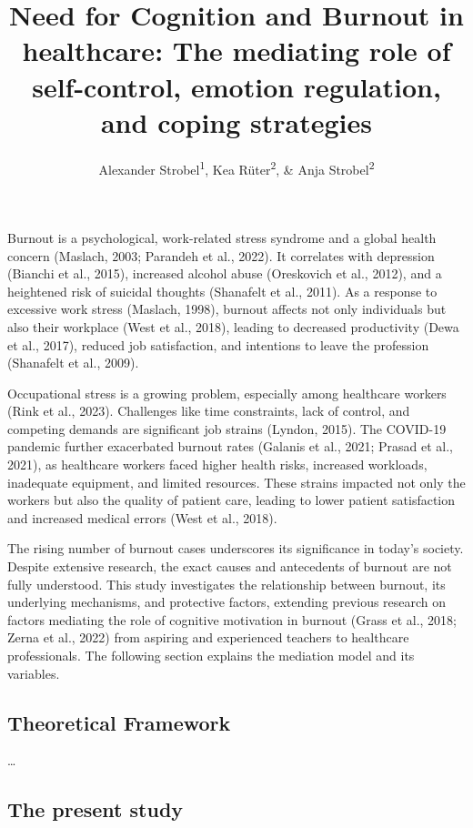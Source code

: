 \documentclass[
  man]{apa6}
\title{Need for Cognition and Burnout in healthcare: The mediating role of self-control, emotion regulation, and coping strategies}
\author{Alexander Strobel\textsuperscript{1}, Kea Rüter\textsuperscript{2}, \& Anja Strobel\textsuperscript{2}}
\date{}
\affiliation{\vspace{0.5cm}\textsuperscript{1} Faculty of Psychology, Technische Universität Dresden, Dresden, Germany\\\textsuperscript{2} Department of Psychology, Technische Universität Chemnitz, Chemnitz, Germany}
\begin{document}
\maketitle

Burnout is a psychological, work-related stress syndrome and a global health concern (Maslach, 2003; Parandeh et al., 2022).
It correlates with depression (Bianchi et al., 2015), increased alcohol abuse (Oreskovich et al., 2012), and a heightened risk of suicidal thoughts (Shanafelt et al., 2011).
As a response to excessive work stress (Maslach, 1998), burnout affects not only individuals but also their workplace (West et al., 2018), leading to decreased productivity (Dewa et al., 2017), reduced job satisfaction, and intentions to leave the profession (Shanafelt et al., 2009).

Occupational stress is a growing problem, especially among healthcare workers (Rink et al., 2023).
Challenges like time constraints, lack of control, and competing demands are significant job strains (Lyndon, 2015).
The COVID-19 pandemic further exacerbated burnout rates (Galanis et al., 2021; Prasad et al., 2021), as healthcare workers faced higher health risks, increased workloads, inadequate equipment, and limited resources.
These strains impacted not only the workers but also the quality of patient care, leading to lower patient satisfaction and increased medical errors (West et al., 2018).

The rising number of burnout cases underscores its significance in today's society.
Despite extensive research, the exact causes and antecedents of burnout are not fully understood.
This study investigates the relationship between burnout, its underlying mechanisms, and protective factors, extending previous research on factors mediating the role of cognitive motivation in burnout (Grass et al., 2018; Zerna et al., 2022) from aspiring and experienced teachers to healthcare professionals.
The following section explains the mediation model and its variables.

\subsection{Theoretical Framework}\label{theoretical-framework}

\ldots{}

\subsection{The present study}\label{the-present-study}
\end{document}
